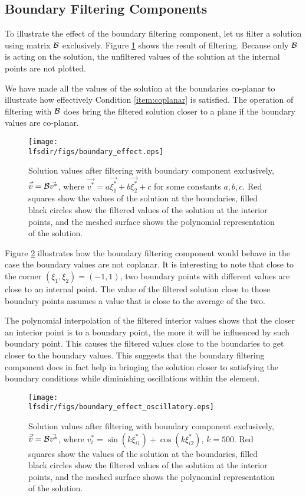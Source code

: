 \subsection{Boundary Filtering Components}
To illustrate the effect of the boundary filtering component, let us filter a solution using matrix $\mathcal{B}$ exclusively. Figure \ref{fig:boundary_effect} shows the result of filtering. Because only $\mathcal{B}$ is acting on the solution, the unfiltered values of the solution at the internal points are not plotted. 

We have made all the values of the solution at the boundaries co-planar to illustrate how effectively Condition \ref{item:coplanar} is satisfied. The operation of filtering with $\mathcal{B}$ does bring the filtered solution closer to a plane if the boundary values are co-planar.

\begin{figure}
\centering
\texttt{[image: \\lfsdir/figs/boundary\_effect.eps]}
\caption{Solution values after filtering with boundary component exclusively, $\vec{\bar{v}} = \mathcal{B}\vec{v^*}$, where  $\vec{v^*} = a\vec{\xi^*_1} + b\vec{\xi^*_2} + c$ for some constants $a,b,c$. Red squares show the values of the solution at the boundaries, filled black circles show the filtered values of the solution at the interior points, and the meshed surface shows the polynomial representation of the solution.} 
\label{fig:boundary_effect}
\end{figure}

Figure \ref{fig:boundary_effect_oscillatory} illustrates how the boundary filtering component would behave in the case the boundary values are not coplanar. It is interesting to note that close to the corner $(\xi_1,\xi_2) = (-1,1)$, two boundary points with different values are close to an internal point. The value  of the filtered solution close to those boundary points assumes a value that is close to the average of the two.

The polynomial interpolation of the filtered interior values shows that the closer an interior point is to a boundary point, the more it will be influenced by such boundary point. This causes the filtered values close to the boundaries to get closer to the boundary values. This suggests that the boundary filtering component does in fact help in bringing the solution closer to satisfying the boundary conditions while diminishing oscillations within the element.

\begin{figure}
\centering
\texttt{[image: \\lfsdir/figs/boundary\_effect\_oscillatory.eps]}
\caption{Solution values after filtering with boundary component exclusively, $\vec{\bar{v}} = \mathcal{B}\vec{v^*}$, where   ${v_i^*} = \sin{(k\xi^*_{i1})} + \cos{(k\xi^*_{i2})} $, $k=500$. Red squares show the values of the solution at the boundaries, filled black circles show the filtered values of the solution at the interior points, and the meshed surface shows the polynomial representation of the solution.} 
\label{fig:boundary_effect_oscillatory}
\end{figure}

